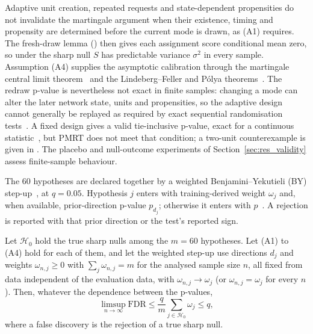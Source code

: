 Adaptive unit creation, repeated requests and state-dependent propensities do not invalidate the martingale argument
when their existence, timing and propensity are determined before the current mode is drawn, as (A1) requires. The
fresh-draw lemma () then gives each assignment score conditional mean zero, so under
the sharp null $S$ has predictable variance $\sigma^2$ in every sample. Assumption (A4) supplies the asymptotic
calibration through the martingale central limit theorem~\cite[Cor.~3.1 and 3.2]{hall1980martingale} and
the Lindeberg--Feller and P\'olya theorems~\cite[Thm.~3.4.10 and Exercise~3.2.9]{durrett2019probability}.
The redraw p-value is nevertheless not exact in finite samples: changing a mode can alter the later network state,
units and propensities, so the adaptive design cannot generally be replayed as required by exact sequential
randomisation tests~\cite{bojinov2019timeseries}. A fixed design gives a valid tie-inclusive p-value,
exact for a continuous statistic~\cite[Sect.~4]{phipson2010permutation}, but PMRT does not meet that
condition; a two-unit counterexample is given in . The placebo and null-outcome
experiments of Section~\ref{sec:res_validity} assess finite-sample behaviour.

The 60 hypotheses are declared together by a weighted Benjamini--Yekutieli (BY)
step-up~\cite[Thm.~1.3]{benjamini2001dependency}, \cite{blanchard2008fdr} at $q = 0.05$. Hypothesis $j$ enters with
training-derived weight $\omega_j$ and, when available, prior-direction p-value $p_{d_j}$; otherwise it enters with
$p$~\cite[Thm.~3.1 and Sect.~5]{roeder2009weighted}. A rejection is reported with that prior direction or the test's
reported sign.

\begin{corollary}
\label{cor:fdr}
Let $\mathcal{H}_0$ hold the true sharp nulls among the $m = 60$ hypotheses. Let (A1) to (A4) hold for each of them,
and let the weighted step-up use directions $d_j$ and weights $\omega_{n,j} \ge 0$ with $\sum_j \omega_{n,j} = m$ for
the analysed sample size $n$, all fixed from data independent of the evaluation data, with $\omega_{n,j} \to \omega_j$
(or $\omega_{n,j} = \omega_j$ for every $n$). Then, whatever the dependence between the p-values,
\begin{equation}
\limsup_{n \to \infty} \mathrm{FDR} \le \frac{q}{m} \sum_{j \in \mathcal{H}_0} \omega_j \le q,
\label{eq:fdr}
\end{equation}
where a false discovery is the rejection of a true sharp null.
\end{corollary}

